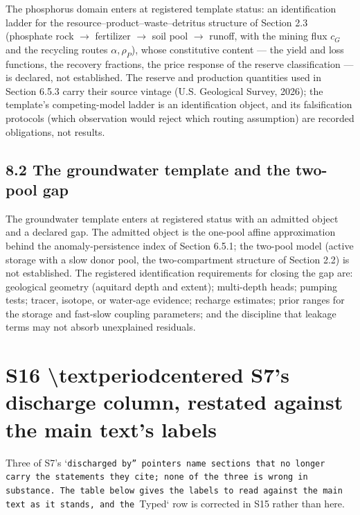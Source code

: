 \documentclass[11pt]{article}
\begin{document}
The phosphorus domain enters at registered template status: an identification ladder for the resource--product--waste--detritus structure of Section 2.3 (phosphate rock \(\rightarrow\) fertilizer \(\rightarrow\) soil pool \(\rightarrow\) runoff, with the mining flux \(c_G\) and the recycling routes \(\alpha, \rho_P\)), whose constitutive content --- the yield and loss functions, the recovery fractions, the price response of the reserve classification --- is declared, not established. The reserve and production quantities used in Section 6.5.3 carry their source vintage (U.S. Geological Survey, 2026); the template's competing-model ladder is an identification object, and its falsification protocols (which observation would reject which routing assumption) are recorded obligations, not results.

\subsection*{8.2 The groundwater template and the two-pool gap}\label{82-the-groundwater-template-and-the-two-pool-gap}

The groundwater template enters at registered status with an admitted object and a declared gap. The admitted object is the one-pool affine approximation behind the anomaly-persistence index of Section 6.5.1; the two-pool model (active storage with a slow donor pool, the two-compartment structure of Section 2.2) is not established. The registered identification requirements for closing the gap are: geological geometry (aquitard depth and extent); multi-depth heads; pumping tests; tracer, isotope, or water-age evidence; recharge estimates; prior ranges for the storage and fast-slow coupling parameters; and the discipline that leakage terms may not absorb unexplained residuals.

\section*{S16 \textbackslash{}textperiodcentered{} S7's discharge column, restated against the main text's labels}\label{s16-textperiodcentered{}-s7's-discharge-column-restated-against-the-ma}

Three of S7's `\texttt{discharged by'' pointers name sections that no longer carry the statements they cite; none of the three is wrong in substance. The table below gives the labels to read against the main text as it stands, and the }Typed` row is corrected in S15 rather than here.
\end{document}

